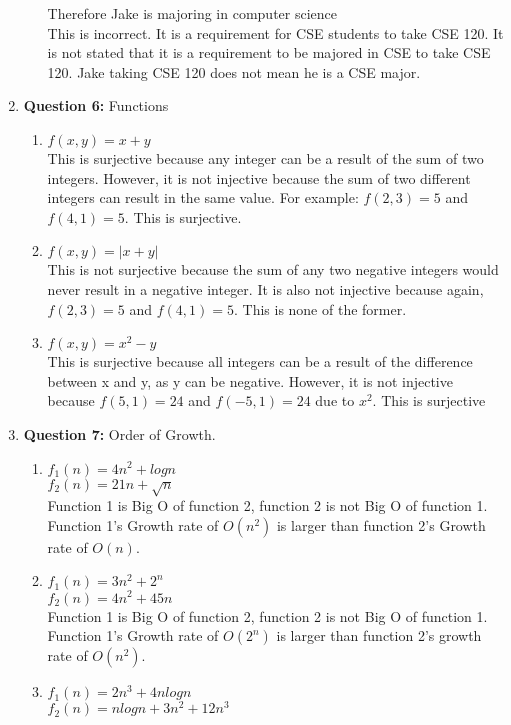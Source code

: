 \documentclass[11pt]{article}
\begin{document}
\begin{enumerate}
\begin{enumerate}[label=(\alph*)]
    Therefore Jake is majoring in computer science \\
    This is incorrect. It is a requirement for CSE students to take CSE 120. It is not stated that it is a requirement to be majored in CSE to take CSE 120. Jake taking CSE 120 does not mean he is a CSE major.
\end{enumerate}
\item
\textbf{Question 6:} Functions
\begin{enumerate}[label=(\alph*)]
    \item
    $f(x,y) = x + y$ \\
    This is surjective because any integer can be a result of the sum of two integers. However, it is not injective because the sum of two different integers can result in the same value. For example: $f(2,3) = 5$ and $f(4,1) = 5$. This is surjective.
    \item 
    $f(x,y) = |x+y|$ \\
    This is not surjective because the sum of any two negative integers would never result in a negative integer. It is also not injective because again, $f(2,3) = 5$ and $f(4,1) = 5$. This is none of the former.
    \item 
    $f(x,y) = x^2-y$ \\
    This is surjective because all integers can be a result of the difference between x and y, as y can be negative. However, it is not  injective because $f(5,1) = 24$ and $f(-5,1) = 24$ due to $x^2$. This is surjective
\end{enumerate}
\item
\textbf{Question 7:} Order of Growth.
\begin{enumerate}[label=(\alph*)]
    \item
    $f_1(n) = 4n^2+logn$\\
    $f_2(n) = 21n + \sqrt{n}$ \\
    Function 1 is Big O of function 2, function 2 is not Big O of function 1. Function 1's Growth rate of $O(n^2)$ is larger than function 2's Growth rate of $O(n)$.
    \item 
    $f_1(n) = 3n^2+2^n$ \\
    $f_2(n) = 4n^2+45n$ \\
    Function 1 is Big O of function 2, function 2 is not Big O of function 1. Function 1's Growth rate of $O(2^n)$ is larger than function 2's growth rate of $O(n^2)$.
    \item 
    $f_1(n) = 2n^3 + 4nlogn$ \\
    $f_2(n) = nlogn + 3n^2 + 12n^3$ \\

\end{enumerate}
\end{enumerate}
\end{document}
